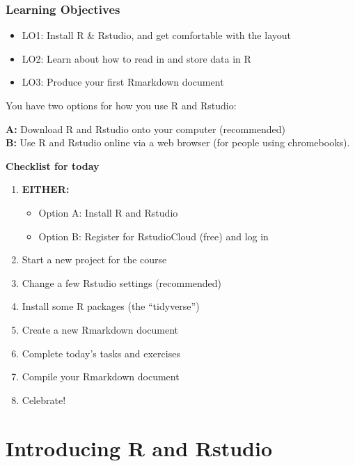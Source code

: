 \documentclass[]{book}
\providecommand{\tightlist}{%
  \setlength{\itemsep}{0pt}\setlength{\parskip}{0pt}}
\begin{document}
\hypertarget{learning-objectives}{%
\subsubsection*{Learning Objectives}\label{learning-objectives}}

\begin{itemize}
\tightlist
\item
  LO1: Install R \& Rstudio, and get comfortable with the layout\\
\item
  LO2: Learn about how to read in and store data in R
\item
  LO3: Produce your first Rmarkdown document\\
\end{itemize}

You have two options for how you use R and Rstudio:

\textbf{A:} Download R and Rstudio onto your computer (recommended)\\
\textbf{B:} Use R and Rstudio online via a web browser (for people using chromebooks).

\textbf{Checklist for today}

\begin{enumerate}
\def\labelenumi{\arabic{enumi}.}
\tightlist
\item
  \textbf{EITHER:}

  \begin{itemize}
  \tightlist
  \item
    Option A: Install R and Rstudio
  \item
    Option B: Register for RstudioCloud (free) and log in
  \end{itemize}
\item
  Start a new project for the course
\item
  Change a few Rstudio settings (recommended)
\item
  Install some R packages (the ``tidyverse'')
\item
  Create a new Rmarkdown document
\item
  Complete today's tasks and exercises
\item
  Compile your Rmarkdown document
\item
  Celebrate!
\end{enumerate}

\hypertarget{introducing-r-and-rstudio}{%
\section{Introducing R and Rstudio}\label{introducing-r-and-rstudio}}
\end{document}
